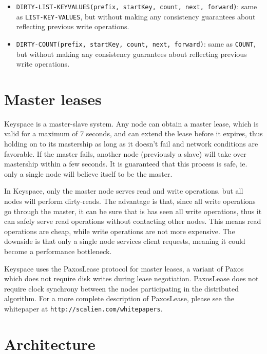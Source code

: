 \documentclass[12pt]{article}
\begin{document}
\begin{itemize}
\item \texttt{DIRTY-LIST-KEYVALUES(prefix, startKey, count, next, forward)}: same as \newline \texttt{LIST-KEY-VALUES}, but without making any consistency guarantees about reflecting previous write operations.
\item \texttt{DIRTY-COUNT(prefix, startKey, count, next, forward)}: same as \newline \texttt{COUNT}, but without making any consistency guarantees about reflecting previous write operations.
\end{itemize}

\section{ Master leases }

Keyspace is a master-slave system. Any node can obtain a master lease, which is valid for a maximum of 7 seconds, and can extend the lease before it expires, thus holding on to its mastership as long as it doesn't fail and network conditions are favorable. If the master fails, another node (previously a slave) will take over mastership within a few seconds. It is guaranteed that this process is safe, ie. only a single node will believe itself to be the master.

In Keyspace, only the master node serves read and write operations. but all nodes will perform dirty-reads. The advantage is that, since all write operations go through the master, it can be sure that is has seen all write operations, thus it can safely serve read operations without contacting other nodes. This means read operations are cheap, while write operations are not more expensive. The downside is that only a single node services client requests, meaning it could become a performance bottleneck.

Keyspace uses the PaxosLease protocol for master leases, a variant of Paxos which does not require disk writes during lease negotiation. PaxosLease does not require clock synchrony between the nodes participating in the distributed algorithm. For a more complete description of PaxosLease, please see the whitepaper at \texttt{http://scalien.com/whitepapers}.

\section{ Architecture }
\end{document}
